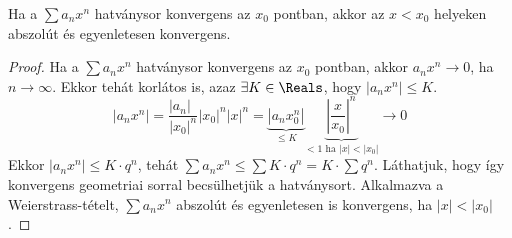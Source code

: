 \begin{theorem}
  Ha a $\sum a_n x^n$ hatványsor konvergens az $x_0$ pontban, akkor az $x < x_0$
  helyeken abszolút és egyenletesen konvergens.

  \begin{center}
  \end{center}

  \begin{proof}
    Ha a $\sum a_n x^n$ hatványsor konvergens az $x_0$ pontban, akkor
    $a_n x^n \to 0$, ha $n \to \infty$. Ekkor tehát korlátos is, azaz
    $\exists K \in \Reals$, hogy $|a_n x^n| \leq K$.
    $$
      \left| a_n x^n \right|
      = \frac{|a_n|^{\phantom{n}}}{|x_0|^n} |x_0|^n |x|^n
      = \underbrace{|a_n x_0^n|}_{\leq K}
      \underbrace{\left|\frac{x}{x_0}\right|^n}_{< 1 \text{ ha } |x| < |x_0|}
      \rightarrow 0
    $$
    Ekkor $|a_n x^n| \leq K \cdot q^n$,
    tehát $\sum a_n x^n \leq \sum K \cdot q^n = K \cdot \sum q^n$. Láthatjuk,
    hogy így konvergens geometriai sorral becsülhetjük a hatványsort. Alkalmazva
    a Weierstrass-tételt, $\sum a_n x^n$ abszolút és egyenletesen is konvergens,
    ha $|x| < |x_0|$.
  \end{proof}
\end{theorem}

